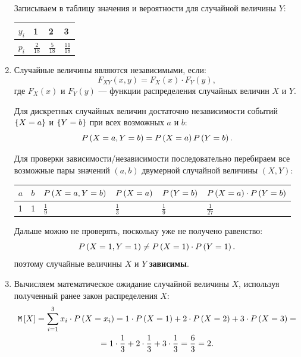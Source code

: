 \begin{enumerate}
    Записываем в таблицу значения и вероятности для случайной величины $Y$:

    \begin{tabular}{|p{1cm}|p{1cm}|p{1cm}|p{1cm}|}
        \hline
        $y_i$ & 1              & 2              & 3               \\
        \hline
        $p_i$ & $\frac{2}{18}$ & $\frac{5}{18}$ & $\frac{11}{18}$ \\
        \hline
    \end{tabular}

    \item Случайные величины являются независимыми, если:
    \begin{equation}
        F_{XY}(x,y) = F_X(x) \cdot F_Y(y),
    \end{equation}
    где $F_X(x)$ и $F_Y(y)$ --- функции распределения случайных величин $X$ и $Y$.

    Для дискретных случайных величин достаточно независимости событий $\left \{ X=a \right \}$ и $\left \{ Y=b \right \}$ при всех возможных $a$ и $b$:
    \begin{equation}
        P \left ( X=a, Y=b \right ) = P \left ( X=a \right ) P \left ( Y=b \right ).
    \end{equation}

    Для проверки зависимости/независимости последовательно перебираем все возможные пары значений $(a, b)$ двумерной случайной величины $(X, Y)$:

    \begin{tabular}{|p{1cm}|p{1cm}|p{3cm}|p{2cm}|p{2cm}|p{5cm}|}
        \hline
        $a$ & $b$ & $P \left ( X=a, Y=b \right )$ & $P \left ( X=a \right )$ & $P \left ( Y=b \right )$ & $P \left ( X=a \right ) \cdot P \left ( Y=b \right )$ \\
        \hline
        1   & 1   & $\frac{1}{9}$            & $\frac{1}{3}$       & $\frac{1}{9}$       & $\frac{1}{27}$                              \\
        \hline
    \end{tabular}

    Дальше можно не проверять, поскольку уже не получено равенство:
    \begin{equation}
        P \left ( X=1, Y=1 \right ) \neq P \left ( X=1 \right ) \cdot P \left ( Y=1 \right ) .
    \end{equation}
    поэтому случайные величины $X$ и $Y$ \textbf{зависимы}.

    \item Вычисляем математическое ожидание случайной величины $X$, используя полученный ранее закон распределения $X$:
    \begin{multline}
        \mathtt{M} \left [ X \right ] = \sum_{i=1}^3 x_i \cdot P \left ( X=x_i \right )
        = 1 \cdot P \left ( X=1 \right ) + 2 \cdot P \left ( X=2 \right ) + 3 \cdot P \left ( X=3 \right ) = \\
        = 1 \cdot \frac{1}{3} + 2 \cdot \frac{1}{3} + 3 \cdot \frac{1}{3}
        = \frac{6}{3} = 2
        .
    \end{multline}


\end{enumerate}

